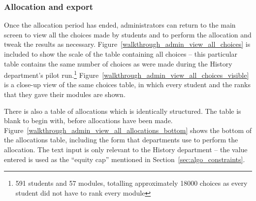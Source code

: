 
\subsubsection{Allocation and export}

Once the allocation period has ended, administrators can return to the main
screen to view all the choices made by students and to perform the allocation
and tweak the results as necessary.
Figure~\ref{walkthrough_admin_view_all_choices} is included to show the scale
of the table containing all choices -- this particular table contains the same
number of choices as were made during the History department's pilot
run.\footnote{591 students and 57 modules, totalling approximately 18000
choices as every student did not have to rank every module}
Figure~\ref{walkthrough_admin_view_all_choices_visible} is a close-up view of
the same choices table, in which every student and the ranks that they gave
their modules are shown.

There is also a table of allocations which is identically structured. The
table is blank to begin with, before allocations have been made.
Figure~\ref{walkthrough_admin_view_all_allocations_bottom} shows the bottom of
the allocations table, including the form that departments use to perform the
allocation. The text input is only relevant to the History department -- the
value entered is used as the ``equity cap'' mentioned in
Section~\ref{sec:algo_constraints}.

